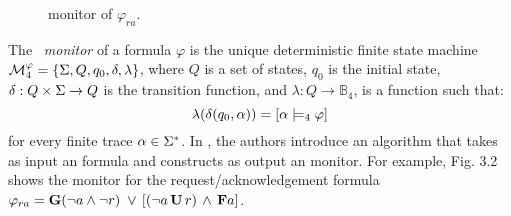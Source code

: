 \begin{figure}[H]
\centering
{}     \caption{\LTLfour monitor of $\varphi_{ra}$.}
\end{figure}
  \label{fig:RVltl}





 
 
The \LTLfour~{\em monitor} of a formula $\varphi$ is the unique deterministic 
finite state machine $\mathcal{M}^{\varphi}_4 = \{ \Sigma, Q, q_0, \delta, 
\lambda\}$, where $Q$ is a set of states, $q_0$ is the initial state, $\delta: Q 
\times \Sigma \to Q$ is the transition function, and $\lambda: Q 
\rightarrow \mathbb{B}_4$, is a function 
such that:
\[
\lambda(\delta(q_0, \alpha)) = \left[\alpha\models_4 \varphi\right]
\]
for every finite trace $\alpha  \in \Sigma^*$.
%
In \cite{bls11} , the authors introduce an algorithm that takes as input an \LTL 
formula and constructs as output an \LTLfour monitor. For example, 
Fig. 3.2 shows the \LTLfour monitor for the 
request/acknowledgement formula 
$\varphi_{ra} = \mathbf{G}(\neg a \wedge \neg r) \; \vee \, [(\neg a \, \mathbf{U} \, r) 
\,\wedge \, \mathbf{F} a]$.









